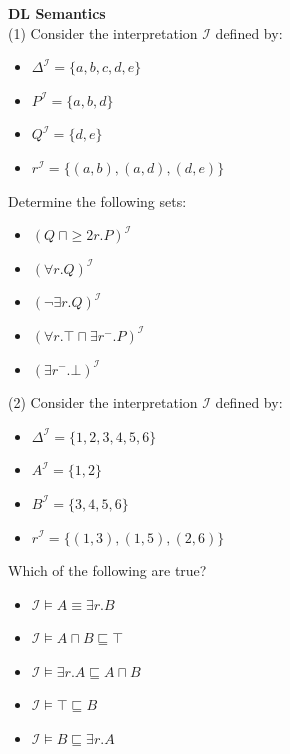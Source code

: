 \documentclass[12pt,a4paper]{article}
\newenvironment{problem}[2][{\color{red}Question}]{\begin{trivlist}
\item[\hskip \labelsep {\bfseries #1}\hskip \labelsep {\bfseries #2.}]}{\end{trivlist}}
\begin{document}
\begin{problem}{{\color{red}5}}
\textbf{DL Semantics}\\
(1) Consider the interpretation $\mathcal{I}$ defined by:
\begin{itemize}
    \item[] $\Delta^{\mathcal{I}}=\{a, b, c, d, e\}$
    \item[] $P^{\mathcal{I}}=\{a, b, d\}$
    \item[] $Q^{\mathcal{I}}=\{d, e\}$
    \item[] $r^{\mathcal{I}}=\{(a, b), (a, d), (d, e)\}$ 
\end{itemize}

Determine the following sets:
\begin{itemize}
    \item $(Q~\sqcap\geq{2}{r}.P)^{\mathcal{I}}$
    \item $(\forall r.Q)^{\mathcal{I}}$
    \item $(\neg\exists r.Q)^{\mathcal{I}}$
    \item $(\forall r.\top\sqcap\exists r^{-}.P)^{\mathcal{I}}$
    \item $(\exists r^{-}.\bot)^{\mathcal{I}}$
\end{itemize}

(2) Consider the interpretation $\mathcal{I}$ defined by:
\begin{itemize}
    \item[] $\Delta^{\mathcal{I}}=\{1,2,3,4,5,6\}$
    \item[] $A^{\mathcal{I}}=\{1,2\}$
    \item[] $B^{\mathcal{I}}=\{3,4,5,6\}$
    \item[] $r^{\mathcal{I}}=\{(1,3),(1,5),(2,6)\}$
\end{itemize}
Which of the following are true?
\begin{itemize}
    \item $\mathcal{I}\models A\equiv\exists r.B$
    \item $\mathcal{I}\models A\sqcap B\sqsubseteq\top$
    \item $\mathcal{I}\models \exists r.A\sqsubseteq A\sqcap B$
    \item $\mathcal{I}\models \top\sqsubseteq B$
    \item $\mathcal{I}\models B\sqsubseteq\exists r.A$
\end{itemize}
\end{problem}
\end{document}
